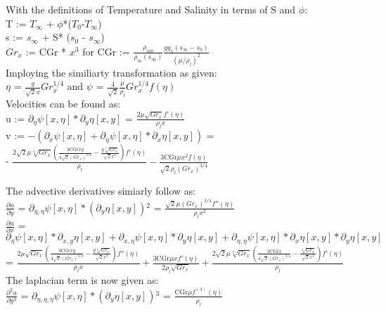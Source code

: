 \documentclass[letterpaper, 10pt]{article}
\begin{document}
With the definitions of Temperature and Salinity in terms of S and $\phi$:\\
T := $T_\infty$ + $\phi$*($T_0$-$T_\infty$)\\
s := $s_\infty $ + S* ($s_0$ - $s_\infty $)\\
$Gr_x$ := CGr * $x^3$ for CGr := $\frac{\rho_{m0}}{\rho_m (s_\infty)}\frac{g g_1 (s_\infty-s_0)}{(\mu/\rho_l)^2}$\\


Imploying the similiarty transformation as given:\\ 
$\eta$ = $\frac{y}{\sqrt{2}x} Gr_x^{1/4}$ and $\psi$ = $\frac{4}{\sqrt{2}}\frac{\mu}{\rho_l} Gr_x^{1/4} f(\eta)$\\

Velocities can be found as:\\
u := $\partial_\eta \psi [x,\eta ]*\partial _y\eta [x,y]$ = $\frac{2 \mu  \sqrt{Gr_x} f'(\eta )}{\rho_l x}$\\
v := $-\left(\partial _x\psi [x,\eta ]+\partial _{\eta }\psi [x,\eta ]*\partial _x\eta [x,y]\right) $ = \\ - $\frac{2 \sqrt{2} \mu  \sqrt[4]{Gr_x} \left(\frac{3 \text{CGr} x y}{4 \sqrt{2} \left(Gr_x\right)^{3/4}}-\frac{y \sqrt[4]{Gr_x}}{\sqrt{2} x^2}\right) f'(\eta )}{\rho_l}-\frac{3 \text{CGr} \mu  x^2 f(\eta )}{\sqrt{2} \rho_l \left(Gr_x\right)^{3/4}}$

The advective derivatives simiarly follow as:\\ 
$\frac{\partial u}{\partial y}$ = $\partial _{\eta ,\eta }\psi [x,\eta ]*\left(\partial _y\eta [x,y]\right){}^2$ = $\frac{\sqrt{2} \mu  \left(Gr_x\right)^{3/4} f''(\eta )}{\rho_l x^2}$\\
$\frac{\partial u}{\partial x}$ = $\partial _{\eta }\psi [x,\eta ]*\partial _{x,y}\eta [x,y]+\partial _{x,\eta }\psi [x,\eta ]*\partial _y\eta [x,y]+\partial
_{\eta ,\eta }\psi [x,\eta ]*\partial _x\eta [x,y]*\partial _y\eta [x,y]$ =  $\frac{2 \mu  \sqrt{Gr_x} \left(\frac{3 \text{CGr} x y}{4 \sqrt{2} \left(Gr_x\right)^{3/4}}-\frac{y \sqrt[4]{Gr_x}}{\sqrt{2} x^2}\right) f''(\eta )}{\rho_l x}+\frac{3 \text{CGr} \mu  x f'(\eta )}{2 \rho_l \sqrt{Gr_x}}+\frac{2 \sqrt{2}\mu  \sqrt[4]{Gr_x} \left(\frac{3 \text{CGr} x}{4 \sqrt{2} \left(Gr_x\right)^{3/4}}-\frac{\sqrt[4]{Gr_x}}{\sqrt{2} x^2}\right) f'(\eta )}{\rho_l}$ \\

The laplacian term is now given as:\\
$\frac{\partial^2 u}{\partial y^2}$ = $\partial _{\eta ,\eta ,\eta }\psi [x,\eta ]*\left(\partial _y\eta [x,y]\right){}^3$ = $\frac{\text{CGr} \mu  f^{(3)}(\eta )}{\rho_l}$\\
\end{document}
